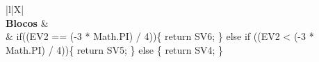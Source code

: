 \begin{xltabular}{\textwidth}{|l|X|}
		 \\ \hline
		\textbf{Blocos} &  \\ \hline
		 & if((EV2 == (-3 * Math.PI) / 4))\{   return SV6; \} else if ((EV2 < (-3 * Math.PI) / 4))\{   return SV5; \} else \{   return SV4; \} \\ \hline



\end{xltabular}
